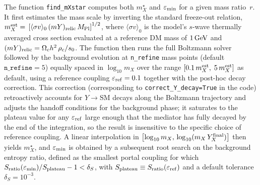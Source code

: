 \documentclass[11pt]{article}
\numberwithin{equation}{section}
\newcommand{\Mpl}{M_{\text{Pl}}}
\newcommand{\sigmav}{\langle\sigma v\rangle}
\begin{document}
The function \texttt{find\_mXstar} computes both $m_X^\star$ and $\varepsilon_{\rm min}$ for a given mass ratio~$r$. It first estimates the mass scale by inverting the standard freeze-out relation, $m_X^{\rm est}=\,\left[\sigmav_0\,(mY)_{\rm relic}\,\Mpl\right]^{1/2}$, where $\sigmav_0$ is the model's $s$-wave thermally averaged cross section evaluated at a reference DM mass of $1\,{\rm GeV}$ and $(mY)_{\rm relic} = \Omega_c h^2\,\rho_c/s_0$. The function then runs the full Boltzmann solver followed by the background evolution at \texttt{n\_refine} mass points (default $\texttt{n\_refine} = 5$) equally spaced in $\log_{10} m_X$ over the range $[0.1\,m_X^{\rm est},\; 5\,m_X^{\rm est}]$ as default, using a reference coupling $\varepsilon_{\rm ref} = 0.1$ together with the post-hoc decay correction. This correction (corresponding to \texttt{correct\_Y\_decay=True} in the code) retroactively accounts for $Y\to\mathrm{SM}$ decays along the Boltzmann trajectory and adjusts the handoff conditions for the background phase; it saturates to the plateau value for any $\varepsilon_{\rm ref}$ large enough that the mediator has fully decayed by the end of the integration, so the result is insensitive to the specific choice of reference coupling. A linear interpolation in $\left[\log_{10} m_X,\,\log_{10}(m_X\,Y_X^{\rm final})\right]$ then yields $m_X^\star$, and $\varepsilon_{\rm min}$ is obtained by a subsequent root search on the background entropy ratio, defined as the smallest portal coupling for which $S_{\rm ratio}(\varepsilon_{\rm min})/S_{\rm plateau} - 1 < \delta_S$, with $S_{\rm plateau} \equiv S_{\rm ratio}(\varepsilon_{\rm ref})$ and a default tolerance $\delta_S = 10^{-3}$.
\end{document}
